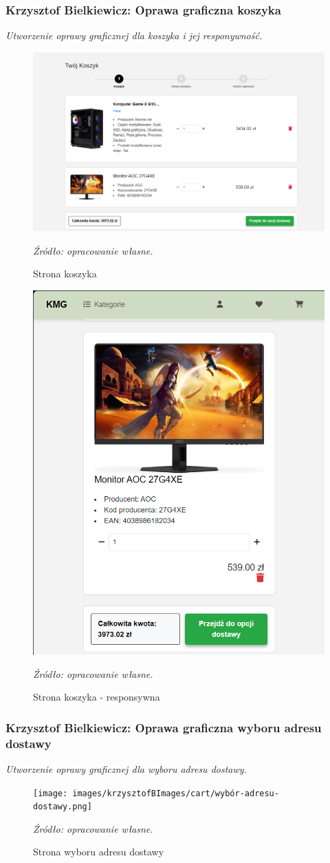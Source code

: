 \documentclass[12pt,a4paper,oneside]{article}
\theoremstyle{definition}
\numberwithin{equation}{section}
\begin{document}
\subsubsection{Krzysztof Bielkiewicz: Oprawa graficzna koszyka}
\label{1.3.8}
\textit{Utworzenie oprawy graficznej dla koszyka i jej responywność.}
\begin{figure}[H]
    \centering
    \includegraphics[width=0.8\columnwidth]{images/krzysztofBImages/cart/cart-step1.png}
    \caption{Strona koszyka}
    \emph{Źródło: opracowanie własne.}
\end{figure}

\begin{figure}[H]
    \centering
    \includegraphics[width=0.5\columnwidth]{images/krzysztofBImages/cart/cart-step1-respo.png}
    \caption{Strona koszyka - responsywna}
    \emph{Źródło: opracowanie własne.}
\end{figure}

\subsubsection{Krzysztof Bielkiewicz: Oprawa graficzna wyboru adresu dostawy}
\label{1.3.9}
\textit{Utworzenie oprawy graficznej dla wyboru adresu dostawy.}
\begin{figure}[H]
    \centering
    \texttt{[image: images/krzysztofBImages/cart/wybór-adresu-dostawy.png]}
    \caption{Strona wyboru adresu dostawy}
    \emph{Źródło: opracowanie własne.}
\end{figure}
\end{document}
